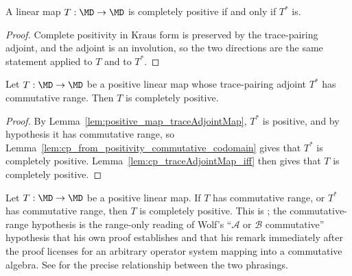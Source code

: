 \begin{lemma}
    \label{lem:cp_traceAdjointMap_iff}
    \leanok
    A linear map $T:\MD\to\MD$ is completely positive if and only if $T^*$
    is.
\end{lemma}

\begin{proof}\leanok
    Complete positivity in Kraus form is preserved by the trace-pairing
    adjoint, and the adjoint is an involution, so the two directions are
    the same statement applied to $T$ and to $T^*$.
\end{proof}

\begin{lemma}
    \label{lem:cp_from_positivity_commutative_domain}
    \leanok
    Let $T:\MD\to\MD$ be a positive linear map whose trace-pairing adjoint
    $T^*$ has commutative range. Then $T$ is completely positive.
\end{lemma}

\begin{proof}\leanok
    By Lemma~\ref{lem:positive_map_traceAdjointMap}, $T^*$ is positive, and
    by hypothesis it has commutative range, so
    Lemma~\ref{lem:cp_from_positivity_commutative_codomain} gives that $T^*$
    is completely positive. Lemma~\ref{lem:cp_traceAdjointMap_iff} then
    gives that $T$ is completely positive.
\end{proof}

\begin{theorem}\label{thm:cp_from_positivity_commutative}
    \leanok
    Let $T:\MD\to\MD$ be a positive linear map. If $T$ has commutative
    range, or $T^*$ has commutative range, then $T$ is completely positive.
    This is \cite[Proposition~1.6]{Wolf2012Quantum}; the commutative-range
    hypothesis is the range-only reading of Wolf's ``$\mathcal A$ or
    $\mathcal B$ commutative'' hypothesis that his own proof establishes and
    that his remark immediately after the proof licenses for an arbitrary
    operator system mapping into a commutative algebra. See
    \cite{gap:wolf_prop16_cp_positivity_commutative_side}
    for the precise relationship between the two phrasings.
\end{theorem}

